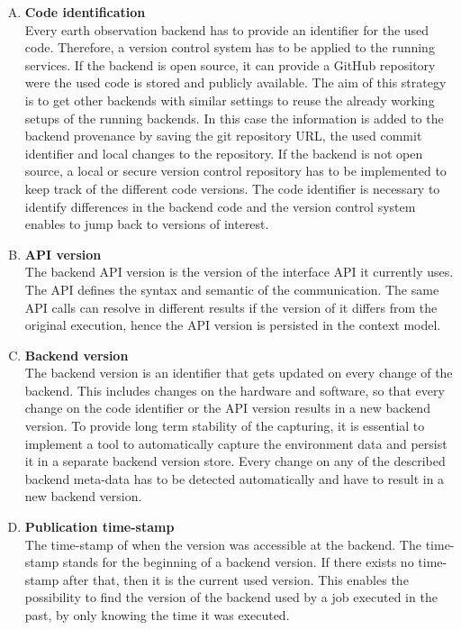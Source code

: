 \documentclass[draft,final]{vutinfth} %
\begin{document}
\begin{enumerate}[(A)]
	\item \textbf{Code identification} \\
	Every earth observation backend has to provide an identifier for the used code. Therefore, a version control system has to be applied to the running services. If the backend is open source, it can provide a GitHub repository were the used code is stored and publicly available. The aim of this strategy is to get other backends with similar settings to reuse the already working setups of the running backends. In this case the information is added to the backend provenance by saving the git repository URL, the used commit identifier and local changes to the repository. If the backend is not open source, a local or secure version control repository has to be implemented to keep track of the different code versions. The code identifier is necessary to identify differences in the backend code and the version control system enables to jump back to versions of interest. 
	\item \textbf{API version} \\
	The backend API version is the version of the interface API it currently uses. The API defines the syntax and semantic of the communication. The same API calls can resolve in different results if the version of it differs from the original execution, hence the API version is persisted in the context model.
	\item \textbf{Backend version} \\
	The backend version is an identifier that gets updated on every change of the backend. This includes changes on the hardware and software, so that every change on the code identifier or the API version results in a new backend version. To provide long term stability of the capturing, it is essential to implement a tool to automatically capture the environment data and persist it in a separate backend version store. Every change on any of the described backend meta-data has to be detected automatically and have to result in a new backend version.    
	\item \textbf{Publication time-stamp} \\
	The time-stamp of when the version was accessible at the backend. The time-stamp stands for the beginning of a backend version. If there exists no time-stamp after that, then it is the current used version. This enables the possibility to find the version of the backend used by a job executed in the past, by only knowing the time it was executed.     
\end{enumerate}
\end{document}
